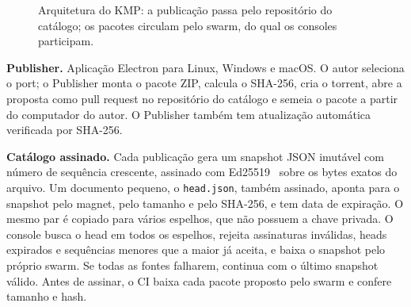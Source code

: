 \documentclass[12pt]{article}
\begin{document}
\begin{figure}[ht]
\centering
{}
\caption{Arquitetura do KMP: a publicação passa pelo repositório do catálogo;
os pacotes circulam pelo swarm, do qual os consoles participam.}
\label{fig:arquitetura}
\end{figure}

\textbf{Publisher.} Aplicação Electron para Linux, Windows e macOS. O autor
seleciona o port; o Publisher monta o pacote ZIP, calcula o SHA-256, cria o
torrent, abre a proposta como pull request no repositório do catálogo e
semeia o pacote a partir do computador do autor. O Publisher também tem
atualização automática verificada por SHA-256.

\textbf{Catálogo assinado.} Cada publicação gera um snapshot JSON imutável
com número de sequência crescente, assinado com Ed25519~\cite{rfc8032} sobre
os bytes exatos do arquivo. Um documento pequeno, o \texttt{head.json},
também assinado, aponta para o snapshot pelo magnet, pelo tamanho e pelo
SHA-256, e tem data de expiração. O mesmo par é copiado para vários
espelhos, que não possuem a chave privada. O console busca o head em todos
os espelhos, rejeita assinaturas inválidas, heads expirados e sequências
menores que a maior já aceita, e baixa o snapshot pelo próprio swarm. Se
todas as fontes falharem, continua com o último snapshot válido. Antes de
assinar, o CI baixa cada pacote proposto pelo swarm e confere tamanho e
hash.
\end{document}
